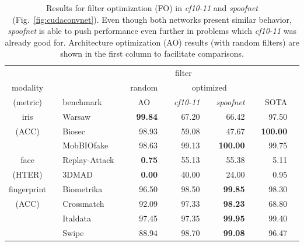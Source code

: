 \begin{table}
\begin{center}
\caption{
Results for filter optimization (FO) in \emph{cf10-11} and \emph{spoofnet} (Fig.~\ref{fig:cudaconvnet}). Even though both networks present similar behavior, \emph{spoofnet} is able to push performance even further in problems which \emph{cf10-11} was already good for.
Architecture optimization (AO) results (with random filters) are shown in the first column to facilitate comparisons.
}
\label{tab:FO}
\begin{tabular}{c@{ }c@{ }l@{ }r@{ }r@{ }r@{ }r@{ }r@{ }r@{ }r@{ }r@{ }c}
\hline
         & \hspace{1em} && \multicolumn{6}{c}{filter}\\ \cline{4-9}
modality & \hspace{1em} &&& random && \multicolumn{3}{c}{optimized} \\ \cline{5-5} \cline{7-9}
(metric) && benchmark \hspace{1em} && \multicolumn{1}{c}{AO} && \textit{cf10-11} && \textit{spoofnet} && SOTA & \\
\hline
iris && Warsaw        && \textbf{99.84}  && 67.20 &&          66.42  &&          97.50 \\
(ACC)&& Biosec        &&         98.93   && 59.08 &&          47.67  && \textbf{100.00} \\
     && MobBIOfake    &&         98.63   && 99.13 && \textbf{100.00} &&          99.75 \\
\hline
face && Replay-Attack &&\textbf{0.75} && 55.13 && 55.38 && 5.11\\
(HTER) && 3DMAD         &&\textbf{0.00} && 40.00 && 24.00 && 0.95\\ 
\hline
fingerprint &&Biometrika    && 96.50 && 98.50&& \textbf{99.85} && 98.30\\
(ACC)     &&Crossmatch    && 92.09 && 97.33&& \textbf{98.23} && 68.80\\
     &&Italdata      && 97.45 && 97.35&& \textbf{99.95} && 99.40\\
     &&Swipe         && 88.94 && 98.70&& \textbf{99.08} && 96.47\\
\hline
\end{tabular}
\end{center}
\end{table}

